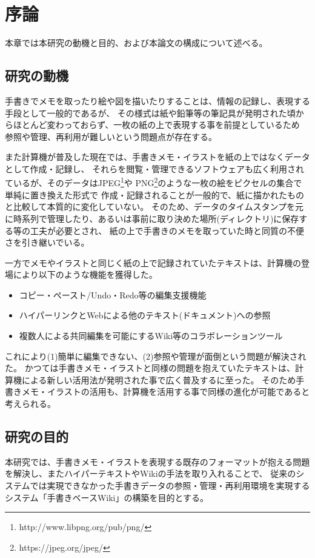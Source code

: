 \chapter{序論}
\label{chap:introduction}

本章では本研究の動機と目的、および本論文の構成について述べる。

\newpage

\section{研究の動機}

手書きでメモを取ったり絵や図を描いたりすることは、情報の記録し、表現する手段として一般的であるが、
その様式は紙や鉛筆等の筆記具が発明された頃からほとんど変わっておらず、一枚の紙の上で表現する事を前提としているため
参照や管理、再利用が難しいという問題点が存在する。

また計算機が普及した現在では、手書きメモ・イラストを紙の上ではなくデータとして作成・記録し、
それらを閲覧・管理できるソフトウェアも広く利用されているが、そのデータはJPEG\footnote{http://www.libpng.org/pub/png/}や
PNG\footnote{https://jpeg.org/jpeg/}のような一枚の絵をピクセルの集合で単純に置き換えた形式で
作成・記録されることが一般的で、紙に描かれたものと比較して本質的に変化していない。
そのため、データのタイムスタンプを元に時系列で管理したり、あるいは事前に取り決めた場所(ディレクトリ)に保存する等の工夫が必要とされ、
紙の上で手書きのメモを取っていた時と同質の不便さを引き継いでいる。

一方でメモやイラストと同じく紙の上で記録されていたテキストは、計算機の登場により以下のような機能を獲得した。

\begin{itemize}
    \item コピー・ペースト/Undo・Redo等の編集支援機能
    \item ハイパーリンクとWebによる他のテキスト(ドキュメント)への参照
    \item 複数人による共同編集を可能にするWiki等のコラボレーションツール
\end{itemize}

これにより(1)簡単に編集できない、(2)参照や管理が面倒という問題が解決された。
かつては手書きメモ・イラストと同様の問題を抱えていたテキストは、計算機による新しい活用法が発明された事で広く普及するに至った。
そのため手書きメモ・イラストの活用も、計算機を活用する事で同様の進化が可能であると考えられる。

\section{研究の目的}
本研究では、手書きメモ・イラストを表現する既存のフォーマットが抱える問題を解決し、またハイパーテキストやWikiの手法を取り入れることで、
従来のシステムでは実現できなかった手書きデータの参照・管理・再利用環境を実現するシステム「手書きベースWiki」の構築を目的とする。

